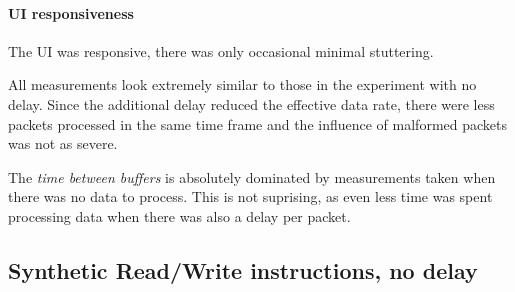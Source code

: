 \paragraph{UI responsiveness}

The UI was responsive, there was only occasional minimal stuttering.
\bigbreak

All measurements look extremely similar to those in the experiment with no delay. Since the additional
delay reduced the effective data rate, there were less packets processed in the same time frame and
the influence of malformed packets was not as severe.

The \textit{time between buffers} is absolutely dominated by measurements taken when there was no
data to process. This is not suprising, as even less time was spent processing data when there was
also a delay per packet.

\subsection{Synthetic Read/Write instructions, no delay}
\label{evaluation/results/synthetic-read-write-instructions-no-delay}

